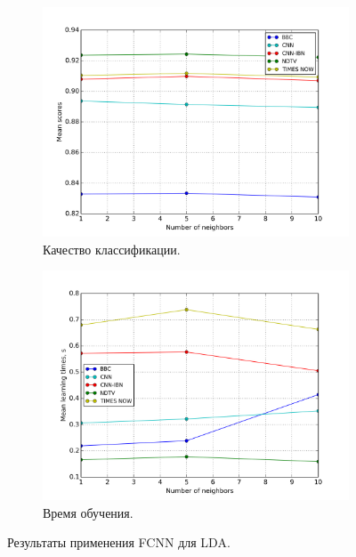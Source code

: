 \begin{figure}[h!]
	\centering
	\begin{subfigure}{0.45\textwidth}
		\includegraphics[width=\textwidth]{images/fcnn-LDA.png}
		\caption{Качество классификации.}
	\end{subfigure}
	\begin{subfigure}{0.45\textwidth}
		\includegraphics[width=\textwidth]{images/fcnn-LDATime.png}
		\caption{Время обучения.}
	\end{subfigure}
	\caption{Результаты применения FCNN для LDA.}\label{fig:fcnn-lda-results}
\end{figure}

